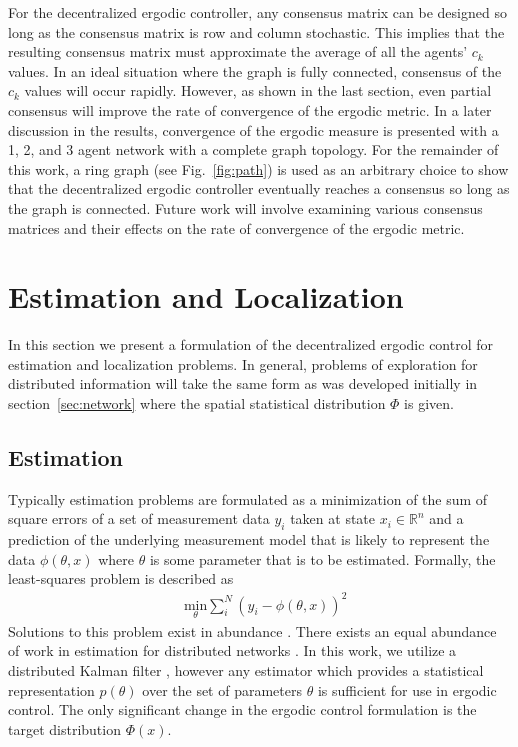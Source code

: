 \documentclass[letterpaper, 10 pt,  conference, twoside]{IEEEtran/IEEEtran}
\theoremstyle{definition}
\begin{document}
For the decentralized ergodic controller, any consensus matrix can be designed so long as the consensus matrix is row and column stochastic. This implies that the resulting consensus matrix must approximate the average of all the agents' $c_k$ values. In an ideal situation where the graph is fully connected, consensus of the $c_k$ values will occur rapidly. However, as shown in the last section, even partial consensus will improve the rate of convergence of the ergodic metric. In a later discussion in the results, convergence of the ergodic measure is presented with a 1, 2, and 3 agent network with a complete graph topology. For the remainder of this work, a ring graph (see Fig.~\ref{fig:path}) is used as an arbitrary choice to show that the decentralized ergodic controller eventually reaches a consensus so long as the graph is connected. Future work will involve examining various consensus matrices and their effects on the rate of convergence of the ergodic metric.

\section{Estimation and Localization} \label{sec:est}

In this section we present a formulation of the decentralized ergodic control for estimation and localization problems. In general, problems of exploration for distributed information will take the same form as was developed initially in section~\ref{sec:network} where the spatial statistical distribution $\Phi$ is given.

\subsection{Estimation}

Typically estimation problems are formulated as a minimization of the sum of square errors of a set of measurement data $y_i$ taken at state $x_i \in \mathbb{R}^n$ and a prediction of the underlying measurement model that is likely to represent the data $\phi(\theta, x)$ where $\theta$ is some parameter that is to be estimated. Formally, the least-squares problem is described as
\begin{equation} \label{eq:leastSquares}
\begin{aligned}
& \underset{\theta}{\text{min}} \sum_{i}^{N} (y_i - \phi(\theta, x))^2
\end{aligned}
\end{equation}
Solutions to this problem exist in abundance \cite{marquardt1963algorithm, julier1997new, wan2000unscented}. There exists an equal abundance of work in estimation for distributed networks \cite{carli2008distributed, liu2014distributed, arablouei2014distributed}. In this work, we utilize a distributed Kalman filter \cite{carli2008distributed}, however any estimator which provides a statistical representation $p(\theta)$ over the set of parameters $\theta$ is sufficient for use in ergodic control. The only significant change in the ergodic control formulation is the target distribution $\Phi(x)$.
\end{document}
